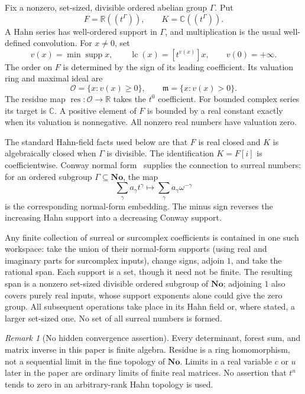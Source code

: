 \documentclass[11pt]{article}
\numberwithin{equation}{section}
\theoremstyle{definition}
\theoremstyle{remark}
\newtheorem{remark}[theorem]{Remark}
\newcommand{\R}{\mathbb R}
\newcommand{\C}{\mathbb C}
\newcommand{\No}{\mathbf{No}}
\newcommand{\Ocal}{\mathcal O}
\newcommand{\mcal}{\mathfrak m}
\newcommand{\res}{\operatorname{res}}
\newcommand{\lc}{\operatorname{lc}}
\newcommand{\supp}{\operatorname{supp}}
\begin{document}
Fix a nonzero, set-sized, divisible ordered abelian group $\Gamma$. Put
\[
 F=\R((t^\Gamma)),\qquad K=\C((t^\Gamma)).
\]
A Hahn series has well-ordered support in $\Gamma$, and multiplication is the
usual well-defined convolution. For $x\ne0$, set
\[
 v(x)=\min\supp x,\qquad \lc(x)=[t^{v(x)}]x,
 \qquad v(0)=+\infty.
\]
The order on $F$ is determined by the sign of its leading coefficient. Its
valuation ring and maximal ideal are
\[
 \Ocal=\{x:v(x)\ge0\},\qquad \mcal=\{x:v(x)>0\}.
\]
The residue map $\res:\Ocal\to\R$ takes the $t^0$ coefficient. For bounded
complex series its target is $\C$. A positive element of $F$ is bounded by a real
constant exactly when its valuation is nonnegative. All nonzero real numbers
have valuation zero.

The standard Hahn-field facts used below are that $F$ is real closed and $K$ is
algebraically closed when $\Gamma$ is divisible. The identification $K=F[i]$ is
coefficientwise. Conway normal form~\cite{Conway,Gonshor} supplies the connection
to surreal numbers: for an ordered subgroup $\Gamma\subseteq\No$, the map
\begin{equation}\label{markov:eq:surreal-embedding}
 \sum_{\gamma}a_\gamma t^\gamma
 \longmapsto \sum_{\gamma}a_\gamma\omega^{-\gamma}
\end{equation}
is the corresponding normal-form embedding. The minus sign reverses the
increasing Hahn support into a decreasing Conway support.

Any finite collection of surreal or surcomplex coefficients is contained in one
such workspace: take the union of their normal-form supports (using real and
imaginary parts for surcomplex inputs), change signs, adjoin $1$, and take the
rational span. Each support is a set, though it need not be finite. The resulting
span is a nonzero set-sized divisible ordered subgroup of $\No$; adjoining $1$
also covers purely real inputs, whose support exponents alone could give the
zero group. All subsequent operations take place in its Hahn field or, where
stated,
a larger set-sized one. No set of all surreal numbers is formed.

\begin{remark}[No hidden convergence assertion]\label{markov:rem:noconv}
Every determinant, forest sum, and matrix inverse in this paper is finite
algebra. Residue is a ring homomorphism, not a sequential limit in the fine
topology of $\No$. Limits in a real variable $c$ or $u$ later in the paper are
ordinary limits of finite real matrices. No assertion that $t^n$ tends to zero
in an arbitrary-rank Hahn topology is used.
\end{remark}
\end{document}
